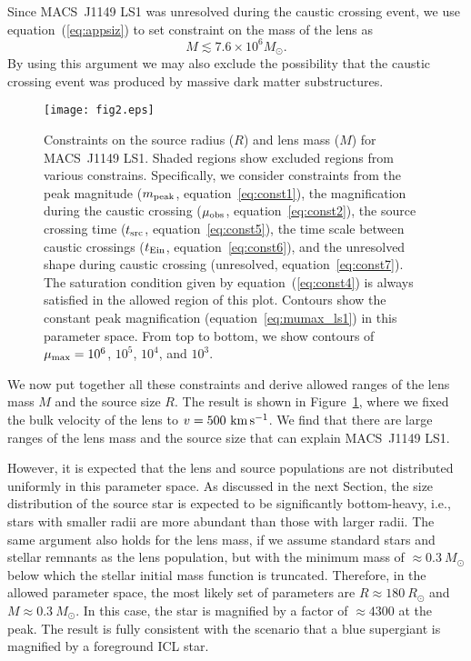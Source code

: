 \documentclass[showpacs,twocolumn,preprintnumbers,amsmath,amssymb,superscriptaddress,nofootinbib]{revtex4}
\begin{document}
Since MACS~J1149 LS1 was unresolved during the caustic crossing event,
we use equation~(\ref{eq:appsiz}) to set constraint on the mass of the
lens as
\begin{equation}
M\lesssim 7.6\times 10^6M_\odot.
\label{eq:const7}
\end{equation}
By using this argument we may also exclude the possibility that the
caustic crossing event was produced by massive dark matter
substructures.

\begin{figure}[t]
\begin{center}
\texttt{[image: fig2.eps]}
\end{center}
\caption{Constraints on the source radius ($R$) and lens mass
  ($M$) for MACS~J1149 LS1. Shaded regions show excluded regions from
  various constrains. Specifically, we consider constraints from the
  peak magnitude ($m_{\rm peak}$, equation~\ref{eq:const1}), the
  magnification during the caustic crossing ($\mu_{\rm obs}$,
  equation~\ref{eq:const2}), the source crossing time ($t_{\rm src}$,
  equation~\ref{eq:const5}), the time scale between caustic crossings
  ($t_{\rm Ein}$, equation~\ref{eq:const6}), and the unresolved shape
  during caustic crossing (unresolved, equation~\ref{eq:const7}). The
  saturation condition given by equation~(\ref{eq:const4}) is always
  satisfied in the allowed region of this plot. Contours show the
  constant peak magnification (equation~\ref{eq:mumax_ls1}) in this
  parameter space. From top to bottom, we show contours of $\mu_{\rm
    max}=10^6$, $10^5$, $10^4$, and $10^3$.}
\label{fig:const}
\end{figure}

We now put together all these constraints and derive allowed ranges of
the lens mass $M$ and the source size $R$. The result is shown in
Figure~\ref{fig:const}, where we fixed the bulk velocity of the lens
to $v=500~{\rm km\,s^{-1}}$. We find that there are large ranges of
the lens mass and the source size that can explain MACS~J1149 LS1. 

However, it is expected that the lens and source populations are not
distributed uniformly in this parameter space. As discussed in the
next Section, the size distribution of the source star is expected to
be significantly bottom-heavy, i.e., stars with smaller radii are more
abundant than those with larger radii. The same argument also holds
for the lens mass, if we assume standard stars and stellar remnants as
the lens population, but with the minimum mass of $\approx 0.3~M_\odot$
below which the stellar initial mass function is truncated. 
Therefore, in the allowed parameter space, the
most likely set of parameters are $R\approx 180~R_\odot$ and $M\approx 
0.3~M_\odot$. In this case, the star is magnified by a factor of
$\approx 4300$ at the peak. The result is fully consistent with the
scenario that a blue supergiant is magnified by a foreground ICL star.
\end{document}

